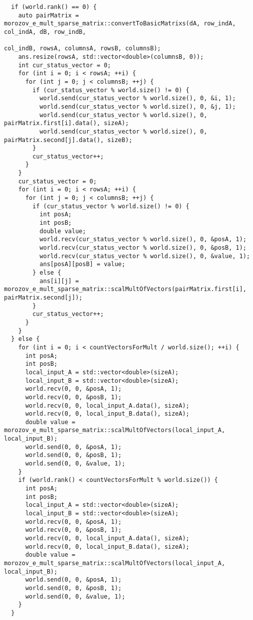 \documentclass[a4paper,12pt]{article}
\begin{document}
\begin{lstlisting}
  if (world.rank() == 0) {
    auto pairMatrix = morozov_e_mult_sparse_matrix::convertToBasicMatrixs(dA, row_indA, col_indA, dB, row_indB,
                                                                          col_indB, rowsA, columnsA, rowsB, columnsB);
    ans.resize(rowsA, std::vector<double>(columnsB, 0));
    int cur_status_vector = 0;
    for (int i = 0; i < rowsA; ++i) {
      for (int j = 0; j < columnsB; ++j) {
        if (cur_status_vector % world.size() != 0) {
          world.send(cur_status_vector % world.size(), 0, &i, 1);
          world.send(cur_status_vector % world.size(), 0, &j, 1);
          world.send(cur_status_vector % world.size(), 0, pairMatrix.first[i].data(), sizeA);
          world.send(cur_status_vector % world.size(), 0, pairMatrix.second[j].data(), sizeB);
        }
        cur_status_vector++;
      }
    }
    cur_status_vector = 0;
    for (int i = 0; i < rowsA; ++i) {
      for (int j = 0; j < columnsB; ++j) {
        if (cur_status_vector % world.size() != 0) {
          int posA;
          int posB;
          double value;
          world.recv(cur_status_vector % world.size(), 0, &posA, 1);
          world.recv(cur_status_vector % world.size(), 0, &posB, 1);
          world.recv(cur_status_vector % world.size(), 0, &value, 1);
          ans[posA][posB] = value;
        } else {
          ans[i][j] = morozov_e_mult_sparse_matrix::scalMultOfVectors(pairMatrix.first[i], pairMatrix.second[j]);
        }
        cur_status_vector++;
      }
    }
  } else {
    for (int i = 0; i < countVectorsForMult / world.size(); ++i) {
      int posA;
      int posB;
      local_input_A = std::vector<double>(sizeA);
      local_input_B = std::vector<double>(sizeA);
      world.recv(0, 0, &posA, 1);
      world.recv(0, 0, &posB, 1);
      world.recv(0, 0, local_input_A.data(), sizeA);
      world.recv(0, 0, local_input_B.data(), sizeA);
      double value = morozov_e_mult_sparse_matrix::scalMultOfVectors(local_input_A, local_input_B);
      world.send(0, 0, &posA, 1);
      world.send(0, 0, &posB, 1);
      world.send(0, 0, &value, 1);
    }
    if (world.rank() < countVectorsForMult % world.size()) {
      int posA;
      int posB;
      local_input_A = std::vector<double>(sizeA);
      local_input_B = std::vector<double>(sizeA);
      world.recv(0, 0, &posA, 1);
      world.recv(0, 0, &posB, 1);
      world.recv(0, 0, local_input_A.data(), sizeA);
      world.recv(0, 0, local_input_B.data(), sizeA);
      double value = morozov_e_mult_sparse_matrix::scalMultOfVectors(local_input_A, local_input_B);
      world.send(0, 0, &posA, 1);
      world.send(0, 0, &posB, 1);
      world.send(0, 0, &value, 1);
    }
  }


\end{lstlisting}
\end{document}
